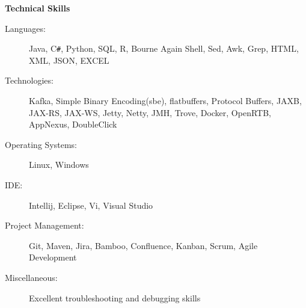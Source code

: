 \documentclass[letterpaper,10pt]{article}
\newcommand{\resheading}[1]{{\large \colorbox{mygrey}{\begin{minipage}{\textwidth}{\textbf{#1 \vphantom{p\^{E}}}}\end{minipage}}}}
\begin{document}
\resheading{Technical Skills}

\begin{description}
\item[Languages:]
Java, C{}\verb!#!, Python, SQL, R, Bourne Again Shell, Sed, Awk, Grep, HTML, XML, JSON, EXCEL
\item[Technologies:]
Kafka, Simple Binary Encoding(sbe), flatbuffers, Protocol Buffers, JAXB, JAX-RS, JAX-WS, Jetty, Netty, JMH, Trove, Docker, OpenRTB, AppNexus, DoubleClick
\item[Operating Systems:]
Linux, Windows
\item[IDE:]
Intellij, Eclipse, Vi, Visual Studio
\item[Project Management:]
Git, Maven, Jira, Bamboo, Confluence, Kanban, Scrum, Agile Development
\item[Miscellaneous:]
Excellent troubleshooting and debugging skills
\end{description}


\end{document}
